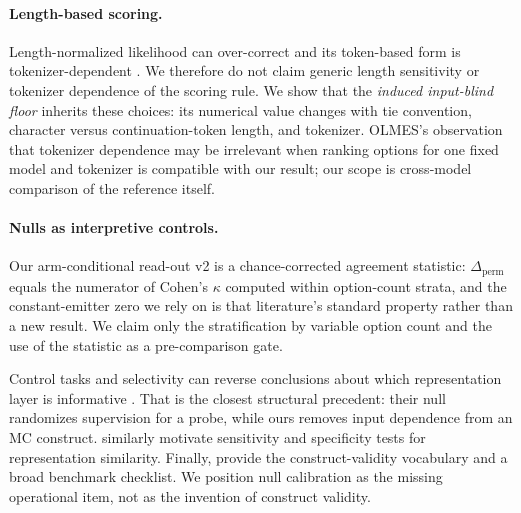 \paragraph{Length-based scoring.}
Length-normalized likelihood can over-correct and its token-based form is tokenizer-dependent \citep{oostermeijer2026length}. We therefore do not claim generic length sensitivity or tokenizer dependence of the scoring rule. We show that the \emph{induced input-blind floor} inherits these choices: its numerical value changes with tie convention, character versus continuation-token length, and tokenizer. OLMES's observation that tokenizer dependence may be irrelevant when ranking options for one fixed model and tokenizer is compatible with our result; our scope is cross-model comparison of the reference itself.

\paragraph{Nulls as interpretive controls.}
Our arm-conditional read-out v2 is a chance-corrected agreement statistic: $\Delta_{\mathrm{perm}}$ equals the numerator of Cohen's $\kappa$ \citep{cohen1960kappa} computed within option-count strata, and the constant-emitter zero we rely on is that literature's standard property rather than a new result. We claim only the stratification by variable option count and the use of the statistic as a pre-comparison gate.

Control tasks and selectivity can reverse conclusions about which representation layer is informative \citep{hewitt2019probes}. That is the closest structural precedent: their null randomizes supervision for a probe, while ours removes input dependence from an MC construct. \citet{ding2021grounding} similarly motivate sensitivity and specificity tests for representation similarity. Finally, \citet{bean2025measuring} provide the construct-validity vocabulary and a broad benchmark checklist. We position null calibration as the missing operational item, not as the invention of construct validity.

